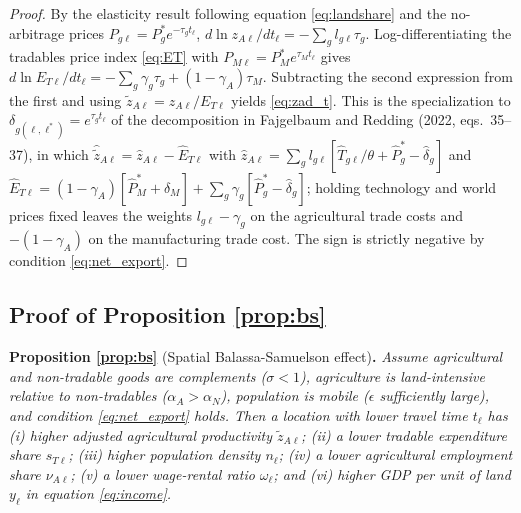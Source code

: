 \documentclass[11pt]{article}
\begin{document}
\begin{proof}
By the elasticity result following equation \eqref{eq:landshare} and the no-arbitrage prices $P_{g\ell}=P_g^\ast e^{-\tau_g t_\ell}$, $d\ln z_{A\ell}/dt_\ell = -\sum_g l_{g\ell}\tau_g$. Log-differentiating the tradables price index \eqref{eq:ET} with $P_{M\ell}=P_M^\ast e^{\tau_M t_\ell}$ gives $d\ln E_{T\ell}/dt_\ell = -\sum_g \gamma_g\tau_g + (1-\gamma_A)\tau_M$. Subtracting the second expression from the first and using $\tilde z_{A\ell}=z_{A\ell}/E_{T\ell}$ yields \eqref{eq:zad_t}. This is the specialization to $\delta_{g(\ell,\ell^\ast)}=e^{\tau_g t_\ell}$ of the decomposition in Fajgelbaum and Redding (2022, eqs.~35--37), in which $\hat{\tilde z}_{A\ell}=\hat z_{A\ell}-\hat E_{T\ell}$ with $\hat z_{A\ell}=\sum_g l_{g\ell}[\hat T_{g\ell}/\theta+\hat P_g^\ast-\hat\delta_g]$ and $\hat E_{T\ell}=(1-\gamma_A)[\hat P_M^\ast+\hat\delta_M]+\sum_g\gamma_g[\hat P_g^\ast-\hat\delta_g]$; holding technology and world prices fixed leaves the weights $l_{g\ell}-\gamma_g$ on the agricultural trade costs and $-(1-\gamma_A)$ on the manufacturing trade cost. The sign is strictly negative by condition \eqref{eq:net_export}.
\end{proof}

\subsection{Proof of Proposition \texorpdfstring{\ref{prop:bs}}{1}}
\label{app:proof_bs}

\noindent\textbf{Proposition \ref{prop:bs}} (Spatial Balassa-Samuelson effect)\textbf{.}
\emph{Assume agricultural and non-tradable goods are complements ($\sigma<1$), agriculture is
land-intensive relative to non-tradables ($\alpha_A>\alpha_N$), population is mobile ($\epsilon$
sufficiently large), and condition \eqref{eq:net_export} holds. Then a location with lower
travel time $t_\ell$ has (i) higher adjusted agricultural productivity $\tilde z_{A\ell}$;
(ii) a lower tradable expenditure share $s_{T\ell}$; (iii) higher population density $n_\ell$;
(iv) a lower agricultural employment share $\nu_{A\ell}$; (v) a lower wage-rental ratio
$\omega_\ell$; and (vi) higher GDP per unit of land $y_\ell$ in equation
\eqref{eq:income}.}\medskip
\end{document}
